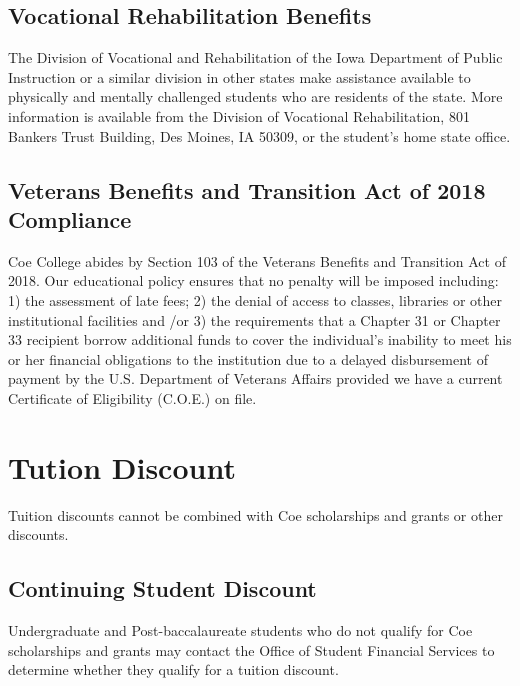 \documentclass[
  letterpaper,
]{scrbook}
\begin{document}
\subsection{\texorpdfstring{\textbf{Vocational Rehabilitation
Benefits}}{Vocational Rehabilitation Benefits}}\label{vocational-rehabilitation-benefits}

The Division of Vocational and Rehabilitation of the Iowa Department of
Public Instruction or a similar division in other states make assistance
available to physically and mentally challenged students who are
residents of the state. More information is available from the Division
of Vocational Rehabilitation, 801 Bankers Trust Building, Des Moines, IA
50309, or the student's home state office.

\subsection{\texorpdfstring{\textbf{Veterans Benefits and Transition Act
of 2018
Compliance}}{Veterans Benefits and Transition Act of 2018 Compliance}}\label{veterans-benefits-and-transition-act-of-2018-compliance}

Coe College abides by Section 103 of the Veterans Benefits and
Transition Act of 2018. Our educational policy ensures that no penalty
will be imposed including: 1) the assessment of late fees; 2) the denial
of access to classes, libraries or other institutional facilities and
/or 3) the requirements that a Chapter 31 or Chapter 33 recipient borrow
additional funds to cover the individual's inability to meet his or her
financial obligations to the institution due to a delayed disbursement
of payment by the U.S. Department of Veterans Affairs provided we have a
current Certificate of Eligibility (C.O.E.) on file.

\section{Tution Discount}\label{tution-discount}

Tuition discounts cannot be combined with Coe scholarships and grants or
other discounts.

\subsection{\texorpdfstring{\textbf{Continuing Student
Discount}}{Continuing Student Discount}}\label{continuing-student-discount}

Undergraduate and Post-baccalaureate students who do not qualify for Coe
scholarships and grants may contact the Office of Student Financial
Services to determine whether they qualify for a tuition discount.
\end{document}
